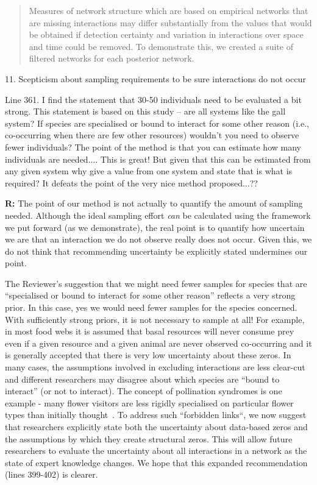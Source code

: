 \documentclass[12pt]{letter}
\newenvironment{refquote}{\bigskip \begin{it}}{\end{it}\smallskip}
\begin{document}
		\begin{quotation}
			Measures of network structure which are based on empirical networks that are missing interactions may differ substantially from the values that would be obtained if detection certainty and variation in interactions over space and time could be removed. To demonstrate this, we created a suite of filtered networks for each posterior network. 
		\end{quotation}


	11. Scepticism about sampling requirements to be sure interactions do not occur 


		\begin{refquote}
		Line 361.  I find the statement that 30-50 individuals need to be evaluated a bit strong.  This statement is based on this study – are all systems like the gall system?  If species are specialised or bound to interact for some other reason (i.e., co-occurring when there are few other resources) wouldn't you need to observe fewer individuals?  The point of the method is that you can estimate how many individuals are needed.... This is great!  But given that this can be estimated from any given system why give a value from one system and state that is what is required?  It defeats the point of the very nice method proposed...??
		\end{refquote}


		\textbf{R:} The point of our method is not actually to quantify the amount of sampling needed. Although the ideal sampling effort \emph{can} be calculated using the framework we put forward (as we demonstrate), the real point is to quantify how uncertain we are that an interaction we do not observe really does not occur. Given this, we do not think that recommending uncertainty be explicitly stated undermines our point. 


		The Reviewer's suggestion that we might need fewer samples for species that are ``specialised or bound to interact for some other reason'' reflects a very strong prior. In this case, yes we would need fewer samples for the species concerned. With sufficiently strong priors, it is not necessary to sample at all! For example, in most food webs it is assumed that basal resources will never consume prey even if a given resource and a given animal are never observed co-occurring and it is generally accepted that there is very low uncertainty about these zeros. In many cases, the assumptions involved in excluding interactions are less clear-cut and different researchers may disagree about which species are ``bound to interact'' (or not to interact). The concept of pollination syndromes is one example - many flower visitors are less rigidly specialised on particular flower types than initially thought~\citep{Ollerton2009}. To address such ``forbidden links``, we now suggest that researchers explicitly state both the uncertainty about data-based zeros and the assumptions by which they create structural zeros. This will allow future researchers to evaluate the uncertainty about all interactions in a network as the state of expert knowledge changes. We hope that this expanded recommendation (lines 399-402) is clearer.
\end{document}
